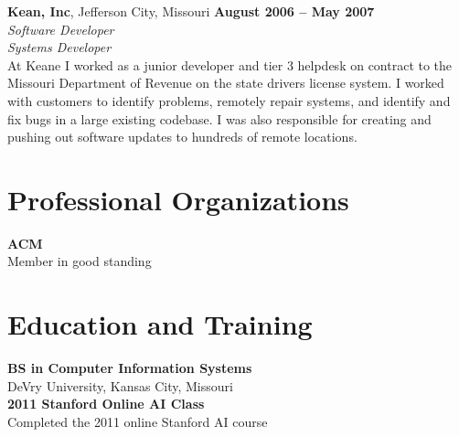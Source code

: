 \documentclass[margin,line]{resume}
\begin{document}
\begin{resume}
\textbf{Kean, Inc}, Jefferson City, Missouri \hfill \textbf{August 2006 -- May 2007}\vspace{1mm}\\\vspace{1mm}%
\textit{\small{Software Developer}}\vspace{1mm}\\\vspace{0mm}%
\textsl{Systems Developer}\\
At Keane I worked as a junior developer and tier 3 helpdesk on contract to the
Missouri Department of Revenue on the state drivers license system. I worked
with customers to identify problems, remotely repair systems, and identify and
fix bugs in a large existing codebase. I was also responsible for creating and
pushing out software updates to hundreds of remote locations.

\section{\mysidestyle \textbf{Professional Organizations}}
\textbf{ACM}\\ Member in good standing

\section{\mysidestyle \textbf{Education and Training}}
\textbf{BS in Computer Information Systems}\\ DeVry University, Kansas City, Missouri\vspace{1mm}\\\vspace{0mm}%
\textbf{2011 Stanford Online AI Class}\\ Completed the 2011 online Stanford AI course

\end{resume}
\end{document}
